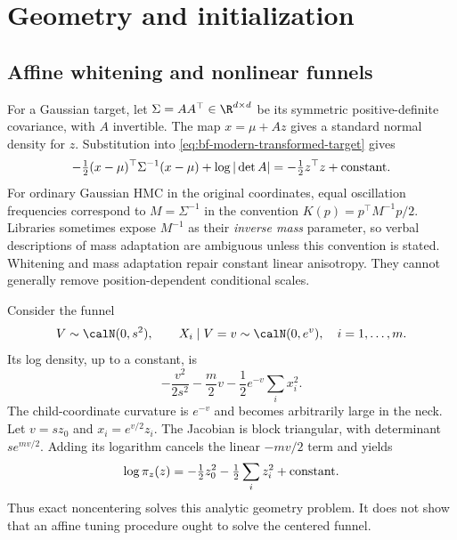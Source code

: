 \section{Geometry and initialization}
\label{sec:bf-modern-geometry}

\subsection{Affine whitening and nonlinear funnels}

For a Gaussian target, let $\Sigma=AA^\top\in\R^{d\times d}$ be its symmetric
positive-definite covariance, with $A$ invertible. The map $x=\mu+Az$
gives a standard normal density for $z$. Substitution into
\eqref{eq:bf-modern-transformed-target} gives
\begin{equation}
 -\tfrac12(x-\mu)^\top\Sigma^{-1}(x-\mu)
       +\log|\det A|= -\tfrac12z^\top z+\hbox{constant}.
 \label{eq:bf-modern-affine-whitening}
\end{equation}
For ordinary Gaussian HMC in the original coordinates, equal oscillation
frequencies correspond to $M=\Sigma^{-1}$ in the convention
$K(p)=p^\top M^{-1}p/2$. Libraries sometimes expose $M^{-1}$ as their
\emph{inverse mass} parameter, so verbal descriptions of mass adaptation are
ambiguous unless this convention is stated. Whitening and mass adaptation
repair constant linear anisotropy. They cannot generally remove
position-dependent conditional scales.

Consider the funnel
\begin{equation}
 V\sim\calN(0,s^2),\qquad X_i\mid V=v\sim\calN(0,e^v),
       \quad i=1,\ldots,m.
 \label{eq:bf-modern-funnel}
\end{equation}
Its log density, up to a constant, is
\begin{equation}
 -\frac{v^2}{2s^2}-\frac m2v-\frac12e^{-v}\sum_i x_i^2.
 \label{eq:bf-modern-funnel-centered}
\end{equation}
The child-coordinate curvature is $e^{-v}$ and becomes arbitrarily large in
the neck. Let $v=sz_0$ and $x_i=e^{v/2}z_i$. The Jacobian is block
triangular, with determinant $s e^{mv/2}$. Adding its logarithm cancels the
linear $-mv/2$ term and yields
\begin{equation}
 \log\pi_z(z)=-\tfrac12z_0^2-\tfrac12\sum_i z_i^2+\hbox{constant}.
 \label{eq:bf-modern-funnel-whitened}
\end{equation}
Thus exact noncentering solves this analytic geometry problem. It does not
show that an affine tuning procedure ought to solve the centered funnel.

